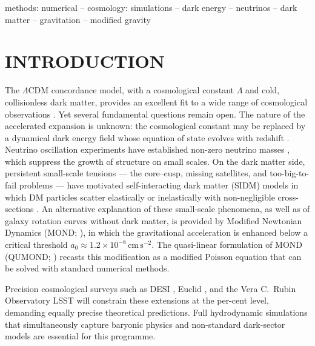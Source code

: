 \documentclass[fleqn,usenatbib]{mnras}
\newcommand{\azero}{a_0}
\begin{document}
\begin{keywords}
methods: numerical -- cosmology: simulations -- dark energy --
neutrinos -- dark matter -- gravitation -- modified gravity
\end{keywords}

\section{INTRODUCTION}
\label{sec:intro}

The $\Lambda$CDM concordance model, with a cosmological constant
$\Lambda$ and cold, collisionless dark matter, provides an excellent
fit to a wide range of cosmological observations
\citep{PlanckCollaboration2020}.  Yet several fundamental questions
remain open.  The nature of the accelerated expansion is unknown: the
cosmological constant may be replaced by a dynamical dark energy field
whose equation of state evolves with redshift
\citep{Chevallier2001,Linder2003}.  Neutrino oscillation experiments
have established non-zero neutrino masses
\citep{Lesgourgues2006,Lattanzi2017}, which suppress the growth of
structure on small scales.  On the dark matter side, persistent
small-scale tensions --- the core--cusp, missing satellites, and
too-big-to-fail problems --- have motivated self-interacting dark
matter (SIDM) models in which DM particles scatter elastically or
inelastically with non-negligible cross-sections
\citep{Spergel2000,Tulin2018}.  An alternative explanation of these
small-scale phenomena, as well as of galaxy rotation curves without
dark matter, is provided by Modified Newtonian Dynamics (MOND;
\citealt{Milgrom1983}), in which the gravitational acceleration is
enhanced below a critical threshold $\azero \approx 1.2 \times
10^{-8}\,\mathrm{cm\,s^{-2}}$.  The quasi-linear formulation of MOND
(QUMOND; \citealt{Milgrom2010}) recasts this modification as a
modified Poisson equation that can be solved with standard numerical
methods.

Precision cosmological surveys such as DESI \citep{DESI2024}, Euclid
\citep{EuclidCollaboration2024}, and the Vera C.\ Rubin Observatory
LSST \citep{Ivezic2019} will constrain these extensions at the
per-cent level, demanding equally precise theoretical predictions.
Full hydrodynamic simulations that simultaneously capture baryonic
physics and non-standard dark-sector models are essential for this
programme.
\end{document}
